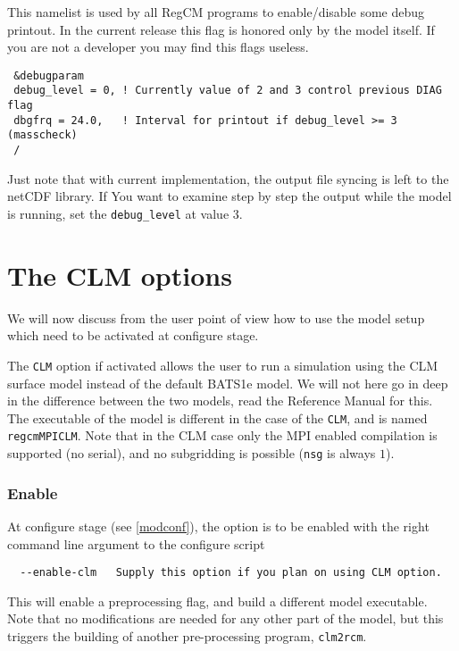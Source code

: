 This namelist is used by all RegCM programs to enable/disable some debug
printout.  In the current release this flag is honored only by the model
itself. If you are not a developer you may find this flags useless.

{\footnotesize
\begin{Verbatim}
 &debugparam
 debug_level = 0, ! Currently value of 2 and 3 control previous DIAG flag
 dbgfrq = 24.0,   ! Interval for printout if debug_level >= 3 (masscheck)
 /
\end{Verbatim}
}

Just note that with current implementation, the output file syncing is left
to the netCDF library. If You want to examine step by step the output while
the model is running, set the \verb=debug_level= at value 3.

\section{The CLM options}
\label{clm}

We will now discuss from the user point of view how to use the model
setup which need to be activated at configure stage.

The \verb=CLM= option if activated allows the user to run a simulation using
the CLM surface model instead of the default BATS1e model. We will not here go
in deep in the difference between the two models, read the Reference Manual
for this.
The executable of the model is different in the case of the \verb=CLM=, and is
named \verb=regcmMPICLM=.
Note that in the CLM case only the MPI enabled compilation is supported (no
serial), and no subgridding is possible (\verb=nsg= is always $1$).

\subsubsection{Enable}

At configure stage (see \ref{modconf}), the option is to be enabled with the
right command line argument to the configure script

\begin{Verbatim}
  --enable-clm   Supply this option if you plan on using CLM option.
\end{Verbatim}

This will enable a preprocessing flag, and build a different model executable.
Note that no modifications are needed for any other part of the model, but
this triggers the building of another pre-processing program, \verb=clm2rcm=.

